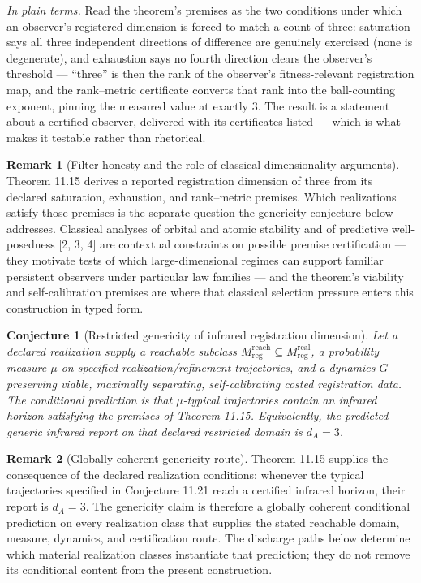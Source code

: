 \documentclass[11pt]{article}
\newtheorem{conjecture}{Conjecture}
\theoremstyle{definition}
\newtheorem{remark}{Remark}
\newcommand{\plainterms}{\emph{In plain terms.}}
\begin{document}
\noindent\plainterms{} Read the theorem's premises as the two conditions under which an observer's registered dimension is forced to match a count of three: saturation says all three independent directions of difference are genuinely exercised (none is degenerate), and exhaustion says no fourth direction clears the observer's threshold --- ``three'' is then the rank of the observer's fitness-relevant registration map, and the rank--metric certificate converts that rank into the ball-counting exponent, pinning the measured value at exactly 3. The result is a statement about a certified observer, delivered with its certificates listed --- which is what makes it testable rather than rhetorical.

\begin{remark}[Filter honesty and the role of classical dimensionality arguments]
Theorem 11.15 derives a reported registration dimension of three from its declared saturation, exhaustion, and rank--metric premises. Which realizations satisfy those premises is the separate question the genericity conjecture below addresses. Classical analyses of orbital and atomic stability and of predictive well-posedness [2, 3, 4] are contextual constraints on possible premise certification --- they motivate tests of which large-dimensional regimes can support familiar persistent observers under particular law families --- and the theorem's viability and self-calibration premises are where that classical selection pressure enters this construction in typed form.
\end{remark}

\begin{conjecture}[Restricted genericity of infrared registration dimension]
Let a declared realization supply a reachable subclass $M^{\mathrm{reach}}_{\mathrm{reg}} \subseteq M^{\mathrm{real}}_{\mathrm{reg}}$, a probability measure $\mu$ on specified realization/refinement trajectories, and a dynamics $G$ preserving viable, maximally separating, self-calibrating costed registration data. The conditional prediction is that $\mu$-typical trajectories contain an infrared horizon satisfying the premises of Theorem 11.15. Equivalently, the predicted generic infrared report on that declared restricted domain is $d_A = 3$.
\end{conjecture}

\begin{remark}[Globally coherent genericity route]
Theorem 11.15 supplies the consequence of the declared realization conditions: whenever the typical trajectories specified in Conjecture 11.21 reach a certified infrared horizon, their report is $d_A = 3$. The genericity claim is therefore a globally coherent conditional prediction on every realization class that supplies the stated reachable domain, measure, dynamics, and certification route. The discharge paths below determine which material realization classes instantiate that prediction; they do not remove its conditional content from the present construction.
\end{remark}
\end{document}
